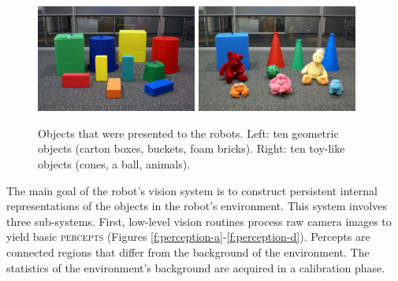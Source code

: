 \begin{figure}[htbp]
  \includegraphics[width=0.47\textwidth]{./experiments/figures/grounding-data-sets-geometric-objects}
  \hspace{0.04\columnwidth}
  \includegraphics[width=0.47\textwidth]{./experiments/figures/grounding-data-sets-toy-objects}
  \caption[Objects that were represented to the robots]{Objects that
    were presented to the robots. Left: ten geometric objects (carton
    boxes, buckets, foam bricks). Right: ten toy-like objects (cones,
    a ball, animals).}
  \label{f:object-sets}
\end{figure}

The main goal of the robot's vision system is to construct persistent
internal representations of the objects in the robot's
environment. This system involves three sub-systems. First,
low-level vision routines process raw camera images to yield basic
\textsc{percepts} (Figures
\ref{f:perception-a}-\ref{f:perception-d}). Percepts are connected
regions that differ from the background of the environment. The
statistics of the environment's background are acquired in a
calibration phase.

